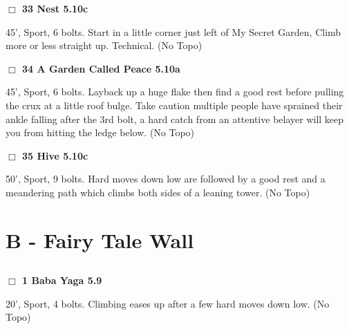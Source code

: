 \begin{multicols}{2}
\needspace{1.5cm}
\label{rt:Nest}
\colorbox{RoyalBlue!20}{
\parbox{0.95\linewidth}{
\hspace{-1ex}\textbf{$\Box$
33 Nest 5.10c  
}}}
\begin{adjustwidth}{1.3em}{}			
45', Sport, 6 bolts. Start in a little corner just left of My Secret Garden, Climb more or less straight up. Technical.
  (No Topo)
\end{adjustwidth}




\needspace{1.5cm}
\label{rt:A Garden Called Peace}
\colorbox{RoyalBlue!20}{
\parbox{0.95\linewidth}{
\hspace{-1ex}\textbf{$\Box$
34 A Garden Called Peace 5.10a  
}}}
\begin{adjustwidth}{1.3em}{}			
45', Sport, 6 bolts. Layback up a huge flake then find a good rest before pulling the crux at a little roof bulge. Take caution multiple people have sprained their ankle falling after the 3rd bolt, a hard catch from an attentive belayer will keep you from hitting the ledge below.
  (No Topo)
\end{adjustwidth}




\needspace{1.5cm}
\label{rt:Hive}
\colorbox{RoyalBlue!20}{
\parbox{0.95\linewidth}{
\hspace{-1ex}\textbf{$\Box$
35 Hive 5.10c  
}}}
\begin{adjustwidth}{1.3em}{}			
50', Sport, 9 bolts. Hard moves down low are followed by a good rest and a meandering path which climbs both sides of a leaning tower.
  (No Topo)
\end{adjustwidth}





\newpage

\section{B - Fairy Tale Wall}\label{sa:Fairy Tale Wall}




\needspace{1.5cm}
\subsection*{}\label{bf:}
	


\needspace{1.5cm}
\label{rt:Baba Yaga}
\colorbox{green!20}{
\parbox{0.95\linewidth}{
\hspace{-1ex}\textbf{$\Box$
1 Baba Yaga 5.9  
}}}
\begin{adjustwidth}{1.3em}{}			
20', Sport, 4 bolts. Climbing eases up after a few hard moves down low.
  (No Topo)
\end{adjustwidth}





\end{multicols}
